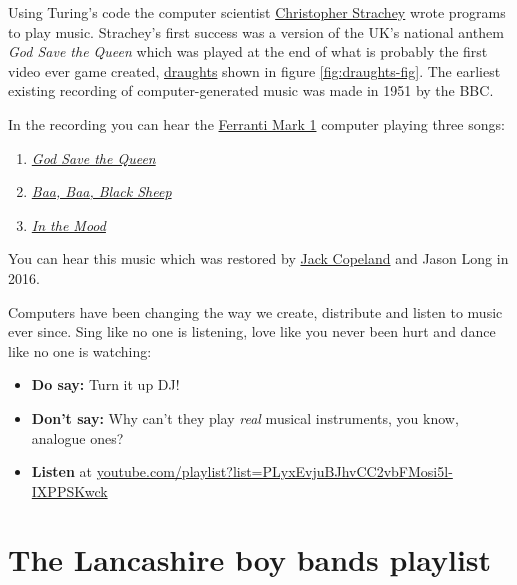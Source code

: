 \documentclass[
]{book}
\providecommand{\tightlist}{%
  \setlength{\itemsep}{0pt}\setlength{\parskip}{0pt}}
\begin{document}
Using Turing's code the computer scientist \href{https://en.wikipedia.org/wiki/Christopher_Strachey}{Christopher Strachey} wrote programs to play music. Strachey's first success was a version of the UK's national anthem \emph{God Save the Queen} \citep{godsavethequeen} which was played at the end of what is probably the first video ever game created, \href{https://en.wikipedia.org/wiki/Checkers}{draughts} shown in figure \ref{fig:draughts-fig}. \citep{programmingenter} The earliest existing recording of computer-generated music was made in 1951 by the BBC.

In the recording you can hear the \href{https://en.wikipedia.org/wiki/Ferranti_Mark_1}{Ferranti Mark 1} computer playing three songs:

\begin{enumerate}
\def\labelenumi{\arabic{enumi}.}
\tightlist
\item
  \emph{\href{https://en.wikipedia.org/wiki/God_Save_the_Queen}{God Save the Queen}} \citep{godsavethequeen}
\item
  \emph{\href{https://en.wikipedia.org/wiki/Baa,_Baa,_Black_Sheep}{Baa, Baa, Black Sheep}} \citep{baabaablacksheep}
\item
  \emph{\href{https://en.wikipedia.org/wiki/In_the_Mood}{In the Mood}} \citep{inthemood}
\end{enumerate}

You can hear this music which was restored by \href{https://en.wikipedia.org/wiki/Jack_Copeland}{Jack Copeland} and Jason Long in 2016. \citep{restoringmusic}

Computers have been changing the way we create, distribute and listen to music ever since. Sing like no one is listening, love like you never been hurt and dance like no one is watching:

\begin{itemize}
\tightlist
\item
  \textbf{Do say:} Turn it up DJ!
\item
  \textbf{Don't say:} Why can't they play \emph{real} musical instruments, you know, analogue ones?
\item
  \textbf{Listen} at \href{https://youtube.com/playlist?list=PLyxEvjuBJhvCC2vbFMosi5l-IXPPSKwck}{youtube.com/playlist?list=PLyxEvjuBJhvCC2vbFMosi5l-IXPPSKwck}
\end{itemize}

\hypertarget{lancs}{%
\section{The Lancashire boy bands playlist}\label{lancs}}
\end{document}
